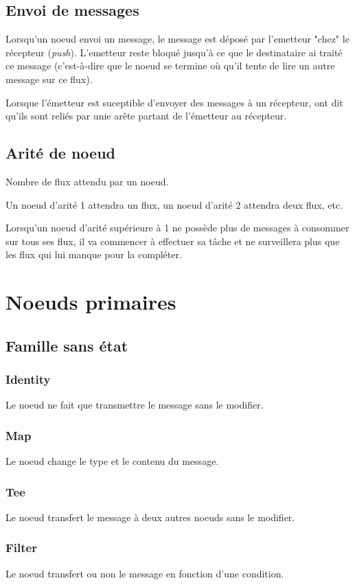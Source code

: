 \documentclass{article}
\begin{document}
\subsection{Envoi de messages}
Lorsqu'un noeud envoi un message, le message est déposé par l'emetteur "chez" le
récepteur (\emph{push}).
L'emetteur reste bloqué jusqu'à ce que le destinataire ai traité ce message (c'est-à-dire
que le noeud se termine où qu'il tente de lire un autre message sur ce flux).

Lorsque l'émetteur est suceptible d'envoyer des messages à un récepteur, ont dit
qu'ils sont reliés par unie arête partant de l'émetteur au récepteur.

\subsection{Arité de noeud}
Nombre de flux attendu par un noeud.

Un noeud d'arité 1 attendra un flux, un noeud d'arité 2 attendra
deux flux, etc.

Lorsqu'un noeud d'arité supérieure à 1 ne possède plus de messages à consommer sur
tous ses flux, il va commencer à effectuer sa tâche et ne surveillera plus que les
flux qui lui manque pour la compléter.

\section{Noeuds primaires}
\subsection{Famille sans état}
\subsubsection{Identity}
Le noeud ne fait que transmettre le message sans le modifier.

\subsubsection{Map}
Le noeud change le type et le contenu du message.

\subsubsection{Tee}
Le noeud transfert le message à deux autres noeuds sans le modifier.

\subsubsection{Filter}
Le noeud transfert ou non le message en fonction d'une condition.
\end{document}

